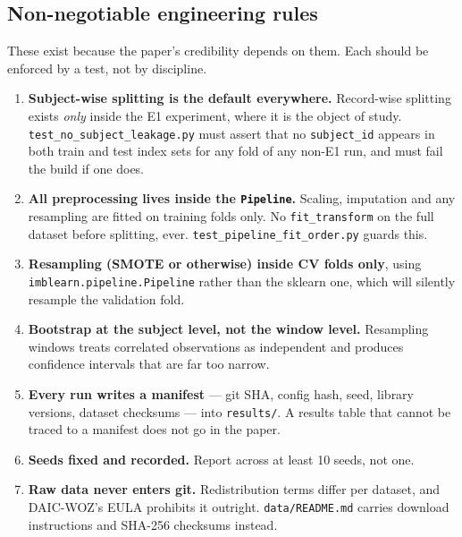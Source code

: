 \documentclass[11pt,a4paper]{article}
\begin{document}
\subsection{Non-negotiable engineering rules}

These exist because the paper's credibility depends on them. Each should be
enforced by a test, not by discipline.

\begin{enumerate}

  \item \textbf{Subject-wise splitting is the default everywhere.} Record-wise
        splitting exists \emph{only} inside the E1 experiment, where it is the
        object of study. \texttt{test\_no\_subject\_leakage.py} must assert
        that no \texttt{subject\_id} appears in both train and test index sets
        for any fold of any non-E1 run, and must fail the build if one does.

  \item \textbf{All preprocessing lives inside the \texttt{Pipeline}.}
        Scaling, imputation and any resampling are fitted on training folds
        only. No \texttt{fit\_transform} on the full dataset before splitting,
        ever. \texttt{test\_pipeline\_fit\_order.py} guards this.

  \item \textbf{Resampling (SMOTE or otherwise) inside CV folds only},
        using \texttt{imblearn.pipeline.Pipeline} rather than the sklearn one,
        which will silently resample the validation fold.

  \item \textbf{Bootstrap at the subject level, not the window level.}
        Resampling windows treats correlated observations as independent and
        produces confidence intervals that are far too narrow.

  \item \textbf{Every run writes a manifest} --- git SHA, config hash, seed,
        library versions, dataset checksums --- into \texttt{results/}.
        A results table that cannot be traced to a manifest does not go in the
        paper.

  \item \textbf{Seeds fixed and recorded.} Report across at least 10 seeds,
        not one.

  \item \textbf{Raw data never enters git.} Redistribution terms differ per
        dataset, and DAIC-WOZ's EULA prohibits it outright.
        \texttt{data/README.md} carries download instructions and SHA-256
        checksums instead.

\end{enumerate}
\end{document}
